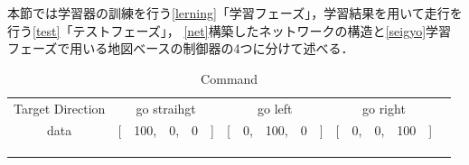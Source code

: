 本節では学習器の訓練を行う\ref{lerning}「学習フェーズ」，学習結果を用いて走行を行う\ref{test}「テストフェーズ」，
\ref{net}構築したネットワークの構造と\ref{seigyo}学習フェーズで用いる地図べースの制御器の4つに分けて述べる．
\vspace{2.0zh}
\begin{table}[h]
    \centering
    \caption{Command}
    \begin{tabular}{cccll}
    \cline{1-4}
    \multicolumn{1}{|c|}{Target Direction} & \multicolumn{1}{c|}{go straihgt}          & \multicolumn{1}{c|}{go left}          & \multicolumn{1}{c|}{go right}          &  \\ \cline{1-4}
    \multicolumn{1}{|c|}{data}  & \multicolumn{1}{c|}{{[}　100,　0,　0　{]}} & \multicolumn{1}{c|}{{[}　0,　100,　0　{]}} & \multicolumn{1}{l|}{{[}　0,　0,　100　{]}} &  \\ \cline{1-4}
                               &                                  &                                  &                                  &  \\
                               &                                  &                                  &                                  &  \\
    \multicolumn{1}{l}{}       &                                  &                                  &                                  & 
    \end{tabular}
    \vspace{-3.0zh}
    \label{tb:comman}
    \end{table}

